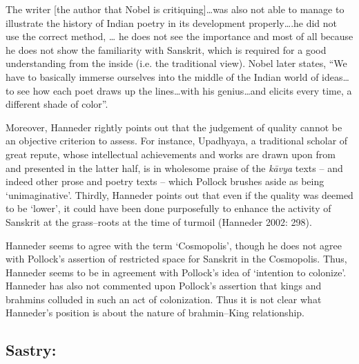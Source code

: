 \begin{myquote}
The writer [the author that Nobel is critiquing]…was also not able to manage to illustrate the history of Indian poetry in its development properly….he did not use the correct method, … he does not see the importance and most of all because he does not show the familiarity with Sanskrit, which is required for a good understanding from the inside (i.e. the traditional view). Nobel later states, “We have to basically immerse ourselves into the middle of the Indian world of ideas…to see how each poet draws up the lines…with his genius…and elicits every time, a different shade of color”.
\end{myquote}

Moreover, Hanneder rightly points out that the judgement of quality cannot be an objective criterion to assess. For instance, Upadhyaya, a traditional scholar of great repute, whose intellectual achievements and works are drawn upon from and presented in the latter half, is in wholesome praise of the \textit{kāvya} texts – and indeed other prose and poetry texts – which Pollock brushes aside as being ‘unimaginative’. Thirdly, Hanneder points out that even if the quality was deemed to be ‘lower’, it could have been done purposefully to enhance the activity of Sanskrit at the grass–roots at the time of turmoil (Hanneder 2002: 298).

Hanneder seems to agree with the term ‘Cosmopolis’, though he does not agree with Pollock’s assertion of restricted space for Sanskrit in the Cosmopolis. Thus, Hanneder seems to be in agreement with Pollock’s idea of ‘intention to colonize’. Hanneder has also not commented upon Pollock’s assertion that kings and brahmins colluded in such an act of colonization. Thus it is not clear what Hanneder’s position is about the nature of brahmin–King relationship.


\subsection*{Sastry:}

